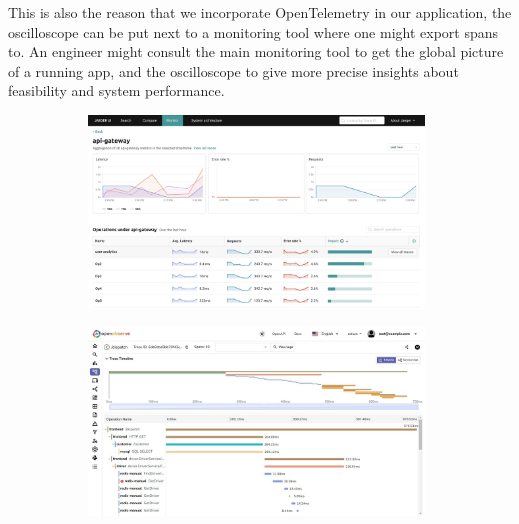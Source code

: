         This is also the reason that we incorporate OpenTelemetry in our application, the oscilloscope can be put next to a monitoring tool where one might export spans to. An engineer might consult the main monitoring tool to get the global picture of a running app, and the oscilloscope to give more precise insights about feasibility and system performance.
       \begin{figure}[H]
            \centering
            \begin{subfigure}{.5\textwidth}
                \centering
                \includegraphics[width=0.98\textwidth]{img/jaeger.png}
                \label{fig:sub1}
            \end{subfigure}%
            \begin{subfigure}{.5\textwidth}
                \centering
                \includegraphics[width =0.98\textwidth]{img/jaeger2.jpg}
                \label{fig:sub2}
            \end{subfigure}
            \label{fig:test}
            \end{figure}

